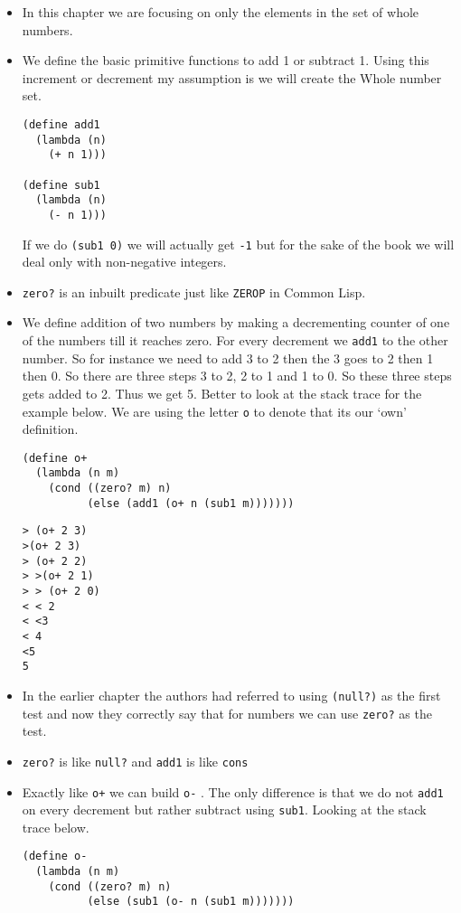 \documentclass[11pt]{article}
\begin{document}
\begin{itemize}
\item In this chapter we are focusing on only the elements in the set of whole numbers.
\item We define the basic primitive functions to add 1 or subtract 1. Using this increment or decrement my assumption is we will create the Whole
number set.
\begin{verbatim}
(define add1
  (lambda (n)
    (+ n 1)))

(define sub1
  (lambda (n)
    (- n 1)))

\end{verbatim}
If we do \texttt{(sub1 0)} we will actually get \texttt{-1} but for the sake of the book we will deal only with non-negative integers.
\item \texttt{zero?} is an inbuilt predicate just like \texttt{ZEROP} in Common Lisp.
\item We define addition of two numbers by making a decrementing counter of one of the numbers till it reaches zero. For every decrement we \texttt{add1}
to the other number. So for instance we need to add 3 to 2 then the 3 goes to 2 then 1 then 0. So there are three steps 3 to 2, 2 to 1 and 1
to 0. So these three steps gets added to 2. Thus we get 5. Better to look at the stack trace for the example below. We are using the letter \texttt{o}
to denote that its our `own' definition.
\begin{verbatim}
(define o+
  (lambda (n m)
    (cond ((zero? m) n)
          (else (add1 (o+ n (sub1 m)))))))

\end{verbatim}

\begin{verbatim}
> (o+ 2 3)
>(o+ 2 3)
> (o+ 2 2)
> >(o+ 2 1)
> > (o+ 2 0)
< < 2
< <3
< 4
<5
5

\end{verbatim}
\item In the earlier chapter the authors had referred to using \texttt{(null?)} as the first test and now they correctly say that for numbers we can
use \texttt{zero?} as the test.
\item \texttt{zero?} is like \texttt{null?} and \texttt{add1} is like \texttt{cons}
\item Exactly like \texttt{o+} we can build \texttt{o-} . The only difference is that we do not \texttt{add1} on every decrement but rather subtract using \texttt{sub1}. Looking
at the stack trace below.
\begin{verbatim}
(define o-
  (lambda (n m)
    (cond ((zero? m) n)
          (else (sub1 (o- n (sub1 m)))))))

\end{verbatim}
\end{itemize}
\end{document}
